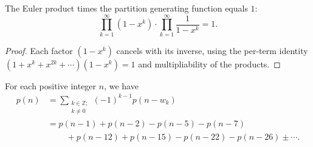 \begin{lemma}
\label{lem.fps.eulerProduct-mul-eulerProductInv}
\leanhelper
\leanok
The Euler product times the partition generating function equals $1$:
\[
\prod_{k=1}^{\infty}(1-x^k) \cdot \prod_{k=1}^{\infty}\frac{1}{1-x^k} = 1.
\]
\end{lemma}

\begin{proof}
\leanok
Each factor $(1-x^k)$ cancels with its inverse, using the per-term identity
$(1 + x^k + x^{2k} + \cdots)(1 - x^k) = 1$ and multipliability of the products.
\end{proof}

\begin{corollary}
\label{cor.pars.pn-rec}
\leantarget
\leanok
For each positive integer $n$, we have
\begin{align*}
p\left(  n\right)   &  =\sum_{\substack{k\in\mathbb{Z};\\k\neq0}}\left(
-1\right)  ^{k-1}p\left(  n-w_{k}\right) \\
&  =p\left(  n-1\right)  +p\left(  n-2\right)  -p\left(  n-5\right)  -p\left(
n-7\right) \\
&  \ \ \ \ \ \ \ \ \ \ +p\left(  n-12\right)  +p\left(  n-15\right)  -p\left(
n-22\right)  -p\left(  n-26\right)  \pm\cdots.
\end{align*}
\end{corollary}

